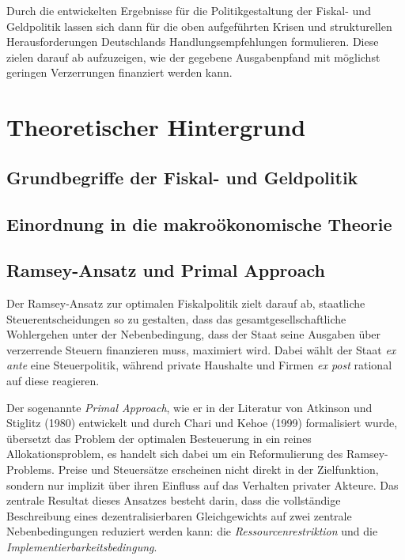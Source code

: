 Durch die entwickelten Ergebnisse für die Politikgestaltung der Fiskal- und Geldpolitik lassen sich dann für die oben aufgeführten Krisen und strukturellen Herausforderungen Deutschlands Handlungsempfehlungen formulieren. Diese zielen darauf ab aufzuzeigen, wie der gegebene Ausgabenpfand mit möglichst geringen Verzerrungen finanziert werden kann. 

\newpage

\section{Theoretischer Hintergrund}

\subsection{Grundbegriffe der Fiskal- und Geldpolitik} 


\subsection{Einordnung in die makroökonomische Theorie} 


\subsection{Ramsey-Ansatz und Primal Approach}

Der Ramsey-Ansatz zur optimalen Fiskalpolitik zielt darauf ab, staatliche Steuerentscheidungen so zu gestalten, dass das gesamtgesellschaftliche Wohlergehen unter der Nebenbedingung, dass der Staat seine Ausgaben über verzerrende Steuern finanzieren muss, maximiert wird. Dabei wählt der Staat \textit{ex ante} eine Steuerpolitik, während private Haushalte und Firmen \textit{ex post} rational auf diese reagieren.

Der sogenannte \textit{Primal Approach}, wie er in der Literatur von Atkinson und Stiglitz (1980) entwickelt und durch Chari und Kehoe (1999) formalisiert wurde, übersetzt das Problem der optimalen Besteuerung in ein reines Allokationsproblem, es handelt sich dabei um ein Reformulierung des  Ramsey-Problems. Preise und Steuersätze erscheinen nicht direkt in der Zielfunktion, sondern nur implizit über ihren Einfluss auf das Verhalten privater Akteure. Das zentrale Resultat dieses Ansatzes besteht darin, dass die vollständige Beschreibung eines dezentralisierbaren Gleichgewichts auf zwei zentrale Nebenbedingungen reduziert werden kann: die \textit{Ressourcenrestriktion} und die \textit{Implementierbarkeitsbedingung}.

